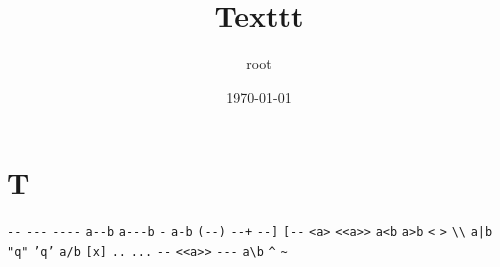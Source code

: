 \documentclass[11pt]{article}
\author{root}
\date{\today}
\title{Texttt}
\begin{document}
\maketitle
\tableofcontents

\section{T}
\label{sec:org10927f7}
\texttt{-{}-{}} \texttt{-{}-{}-} \texttt{-{}-{}-{}-{}} \texttt{a-{}-{}b} \texttt{a-{}-{}-b} \texttt{-} \texttt{a-b} \texttt{(-{}-{})} \texttt{-{}-{}+} \texttt{-{}-{}]} \texttt{[-{}-{}} \texttt{<a>} \texttt{<{}<{}a>{}>{}} \texttt{a<b} \texttt{a>b} \texttt{<} \texttt{>} \texttt{\textbackslash{}\textbackslash{}} \texttt{a|b} \texttt{"q"} \texttt{'q'} \texttt{a/b} \texttt{[x]} \texttt{..} \texttt{...}
\texttt{-{}-{}} \texttt{<{}<{}a>{}>{}} \texttt{-{}-{}-} \texttt{a\textbackslash{}b} \texttt{\textasciicircum{}} \texttt{\textasciitilde{}}
\end{document}
